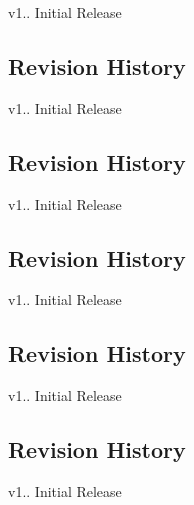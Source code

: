 \begin{DoxyItemize}
\item v1.. Initial Release
\end{DoxyItemize}\hypertarget{group___h_p_l_hpl_sleep_rev}{}\subsection{Revision History}\label{group___h_p_l_hpl_sleep_rev}

\begin{DoxyItemize}
\item v1.. Initial Release
\end{DoxyItemize}\hypertarget{group___h_p_l_hpl_time_measure_rev}{}\subsection{Revision History}\label{group___h_p_l_hpl_time_measure_rev}

\begin{DoxyItemize}
\item v1.. Initial Release
\end{DoxyItemize}\hypertarget{group___h_p_l_hpl_timer_rev}{}\subsection{Revision History}\label{group___h_p_l_hpl_timer_rev}

\begin{DoxyItemize}
\item v1.. Initial Release
\end{DoxyItemize}\hypertarget{group___h_p_l_hpl_usart_sync_rev}{}\subsection{Revision History}\label{group___h_p_l_hpl_usart_sync_rev}

\begin{DoxyItemize}
\item v1.. Initial Release
\end{DoxyItemize}\hypertarget{group___h_p_l_hpl_usart_rev}{}\subsection{Revision History}\label{group___h_p_l_hpl_usart_rev}

\begin{DoxyItemize}
\item v1.. Initial Release 
\end{DoxyItemize}

